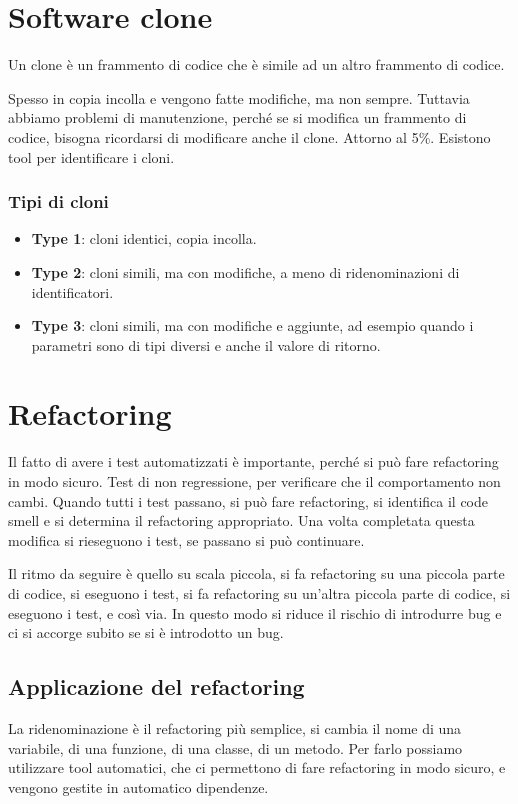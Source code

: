 \section{Software clone}
\begin{tcolorbox}[title = Clone]
    Un clone è un frammento di codice che è simile ad un altro frammento
    di codice.
\end{tcolorbox}
Spesso in copia incolla e vengono fatte modifiche, ma non sempre. Tuttavia 
abbiamo problemi di manutenzione, perché se si modifica un frammento
di codice, bisogna ricordarsi di modificare anche il clone. Attorno 
al 5\%. Esistono tool per identificare i cloni.
\subsubsection{Tipi di cloni}
\begin{itemize}
    \item \textbf{Type 1}: cloni identici, copia incolla.
    \item \textbf{Type 2}: cloni simili, ma con modifiche, a meno di 
    ridenominazioni di identificatori.
    \item \textbf{Type 3}: cloni simili, ma con modifiche e aggiunte, 
    ad esempio quando i parametri sono di tipi diversi e anche il valore 
    di ritorno.
\end{itemize}
\section{Refactoring}
Il fatto di avere i test automatizzati è importante, perché
si può fare refactoring in modo sicuro. Test di non regressione,
per verificare che il comportamento non cambi. 
Quando tutti i test passano, si può fare refactoring, si identifica 
il code smell e si determina il refactoring appropriato. Una volta completata 
questa modifica si rieseguono i test, se passano si può continuare.

Il ritmo da seguire è quello su scala piccola, si fa refactoring
su una piccola parte di codice, si eseguono i test, si fa refactoring 
su un'altra piccola parte di codice, si eseguono i test, e così via.
In questo modo si riduce il rischio di introdurre bug e ci si accorge
subito se si è introdotto un bug.
\subsection{Applicazione del refactoring}
La ridenominazione è il refactoring più semplice, si cambia il nome
di una variabile, di una funzione, di una classe, di un metodo. Per farlo possiamo 
utilizzare tool automatici, che ci permettono di fare refactoring
in modo sicuro, e vengono gestite in automatico dipendenze.

